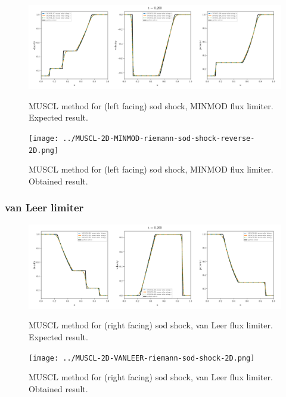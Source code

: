     \begin{figure}[htbp]
        \centering
        \includegraphics[width=.9\textwidth]{./figures/MUSCL-2D-MINMOD-riemann-sod-shock-reverse-2D.png}%
        \caption{MUSCL method for (left facing) sod shock, MINMOD flux limiter. Expected result.}
        \texttt{[image: ../MUSCL-2D-MINMOD-riemann-sod-shock-reverse-2D.png]}%
        \caption{MUSCL method for (left facing) sod shock, MINMOD flux limiter. Obtained result.}
    \end{figure}






\clearpage
\subsubsection{van Leer limiter}

    \begin{figure}[htbp]
        \centering
        \includegraphics[width=.9\textwidth]{./figures/MUSCL-2D-VANLEER-riemann-sod-shock-2D.png}%
        \caption{MUSCL method for (right facing) sod shock, van Leer flux limiter. Expected result.}
        \texttt{[image: ../MUSCL-2D-VANLEER-riemann-sod-shock-2D.png]}%
        \caption{MUSCL method for (right facing) sod shock, van Leer flux limiter. Obtained result.}
    \end{figure}


